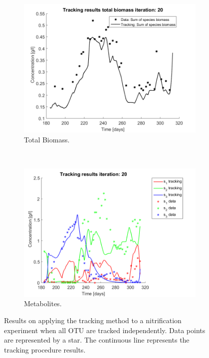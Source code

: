 \documentclass[processes,article,submit,moreauthors,pdftex]{Definitions/mdpi}
\begin{document}
\begin{figure}[h]
	\centering
	\begin{subfigure}{0.45 \linewidth}
		\includegraphics[width= \textwidth]{Application/200407_iter_20_Biomass}
		\caption{Total Biomass.}
		\label{Total Biomass application all}
	\end{subfigure}
	~
	\begin{subfigure}{0.45 \linewidth}
		\includegraphics[width=\textwidth]{Application/200407_iter_20_metabolites}
		\caption{Metabolites.}
		\label{Metabolites application all}
	\end{subfigure}
	\caption{Results on applying the tracking method to a nitrification experiment when all OTU are tracked independently. Data points are represented by a star. The continuous line represents the tracking procedure results.}
	\label{all_OTU_results}
\end{figure}
\end{document}
